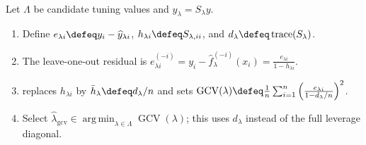 \begin{method} \label{meth:sl-generalized-cross-validation} \\
Let $\Lambda$ be candidate tuning values and $\widehat{y}_\lambda=S_\lambda y$.
\begin{enumerate}[label=(\roman*)]
\setlength{\itemsep}{0pt}
\item Define $e_{\lambda i}\defeq y_i-\widehat{y}_{\lambda i}$, $h_{\lambda i}\defeq S_{\lambda,ii}$, and $d_\lambda\defeq\operatorname{trace}(S_\lambda)$.
\item The leave-one-out residual is $e^{(-i)}_{\lambda i}=y_i-\widehat{f}^{(-i)}_\lambda(x_i)=\frac{e_{\lambda i}}{1-h_{\lambda i}}$.
\item {} replaces $h_{\lambda i}$ by $\bar h_\lambda\defeq d_\lambda/n$ and sets $\operatorname{GCV}(\lambda)\defeq\frac{1}{n}\sum_{i=1}^n\left(\frac{e_{\lambda i}}{1-d_\lambda/n}\right)^2$.
\item Select $\widehat{\lambda}_{\mathrm{gcv}}\in\operatorname*{arg\,min}_{\lambda\in\Lambda}\operatorname{GCV}(\lambda)$; this uses $d_\lambda$ instead of the full leverage diagonal.
\end{enumerate}
\end{method}
